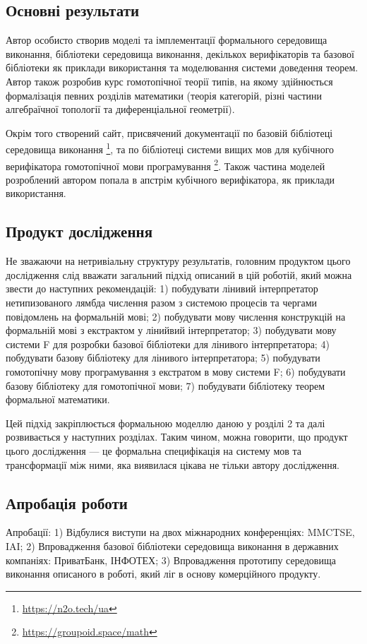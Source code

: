 \subsection{Основні результати}
Автор особисто створив моделі та імплементації формального середовища виконання,
бібліотеки середовища виконання, декількох верифікаторів та базової бібліотеки
як приклади використання та моделювання системи доведення теорем. Автор також
розробив курс гомотопічної теорії типів, на якому здійнюється формалізація
певних розділів математики (теорія категорій, різні частини алгебраїчної
топології та диференціальної геометрії).

Окрім того створений сайт, присвячений документації по базовій бібліотеці
середовища виконання \footnote{\url{https://n2o.tech/ua}},
та по бібліотеці системи вищих мов для кубічного верифікатора гомотопічної
мови програмування \footnote{\url{https://groupoid.space/math}}. Також частина
моделей розроблений автором попала в апстрім кубічного верифікатора, як приклади використання.

\subsection{Продукт дослідження}
Не зважаючи на нетривіальну структуру результатів, головним продуктом цього
дослідження слід вважати загальний підхід описаний в цій роботій, який можна
звести до наступних рекомендацій:
1) побудувати лінивий інтерпретатор нетипизованого лямбда числення разом з системою процесів та чергами повідомлень на формальній мові;
2) побудувати мову числення конструкцій на формальній мові з екстрактом у лінийвий інтерпретатор;
3) побудувати мову системи F для розробки базової бібліотеки для лінивого інтерпретатора;
4) побудувати базову бібліотеку для лінивого інтерпретатора;
5) побудувати гомотопічну мову програмування з екстратом в мову системи F;
6) побудувати базову бібліотеку для гомотопічної мови;
7) побудувати бібліотеку теорем формальної математики.

Цей підхід закріплюється формальною моделлю даною у розділі 2 та далі розвивається у наступних розділах.
Таким чином, можна говорити, що продукт цього дослідження --- це формальна специфікація на систему мов та
трансформації між ними, яка виявилася цікава не тільки автору дослідження.

\subsection{Апробація роботи}
Апробації:
1) Відбулися виступи на двох міжнародних конференціях: MMCTSE, IAI;
2) Впровадження базової бібліотеки середовища виконання в державних компаніях: ПриватБанк, ІНФОТЕХ;
3) Впровадження прототипу середовища виконання описаного в роботі, який ліг в основу комерційного продукту.

